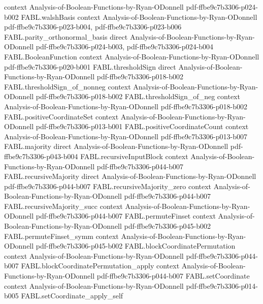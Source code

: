 \begin{theorem}
  {context}
  {Analysis-of-Boolean-Functions-by-Ryan-ODonnell}
  {pdf-ffbe9c7b3306-p024-b002}
\proofstep
  {FABL.walshBasis}
  {context}
  {Analysis-of-Boolean-Functions-by-Ryan-ODonnell}
  {pdf-ffbe9c7b3306-p023-b004,
    pdf-ffbe9c7b3306-p023-b006}
\proofstep
  {FABL.parity_orthonormal_basis}
  {direct}
  {Analysis-of-Boolean-Functions-by-Ryan-ODonnell}
  {pdf-ffbe9c7b3306-p024-b003,
    pdf-ffbe9c7b3306-p024-b004}
\proofstep
  {FABL.BooleanFunction}
  {context}
  {Analysis-of-Boolean-Functions-by-Ryan-ODonnell}
  {pdf-ffbe9c7b3306-p020-b001}
\proofstep
  {FABL.thresholdSign}
  {direct}
  {Analysis-of-Boolean-Functions-by-Ryan-ODonnell}
  {pdf-ffbe9c7b3306-p018-b002}
\proofstep
  {FABL.thresholdSign_of_nonneg}
  {context}
  {Analysis-of-Boolean-Functions-by-Ryan-ODonnell}
  {pdf-ffbe9c7b3306-p018-b002}
\proofstep
  {FABL.thresholdSign_of_neg}
  {context}
  {Analysis-of-Boolean-Functions-by-Ryan-ODonnell}
  {pdf-ffbe9c7b3306-p018-b002}
\proofstep
  {FABL.positiveCoordinateSet}
  {context}
  {Analysis-of-Boolean-Functions-by-Ryan-ODonnell}
  {pdf-ffbe9c7b3306-p013-b001}
\proofstep
  {FABL.positiveCoordinateCount}
  {context}
  {Analysis-of-Boolean-Functions-by-Ryan-ODonnell}
  {pdf-ffbe9c7b3306-p013-b007}
\proofstep
  {FABL.majority}
  {direct}
  {Analysis-of-Boolean-Functions-by-Ryan-ODonnell}
  {pdf-ffbe9c7b3306-p043-b004}
\proofstep
  {FABL.recursiveInputBlock}
  {context}
  {Analysis-of-Boolean-Functions-by-Ryan-ODonnell}
  {pdf-ffbe9c7b3306-p044-b007}
\proofstep
  {FABL.recursiveMajority}
  {direct}
  {Analysis-of-Boolean-Functions-by-Ryan-ODonnell}
  {pdf-ffbe9c7b3306-p044-b007}
\proofstep
  {FABL.recursiveMajority_zero}
  {context}
  {Analysis-of-Boolean-Functions-by-Ryan-ODonnell}
  {pdf-ffbe9c7b3306-p044-b007}
\proofstep
  {FABL.recursiveMajority_succ}
  {context}
  {Analysis-of-Boolean-Functions-by-Ryan-ODonnell}
  {pdf-ffbe9c7b3306-p044-b007}
\proofstep
  {FABL.permuteFinset}
  {context}
  {Analysis-of-Boolean-Functions-by-Ryan-ODonnell}
  {pdf-ffbe9c7b3306-p045-b002}
\proofstep
  {FABL.permuteFinset_symm}
  {context}
  {Analysis-of-Boolean-Functions-by-Ryan-ODonnell}
  {pdf-ffbe9c7b3306-p045-b002}
\proofstep
  {FABL.blockCoordinatePermutation}
  {context}
  {Analysis-of-Boolean-Functions-by-Ryan-ODonnell}
  {pdf-ffbe9c7b3306-p044-b007}
\proofstep
  {FABL.blockCoordinatePermutation_apply}
  {context}
  {Analysis-of-Boolean-Functions-by-Ryan-ODonnell}
  {pdf-ffbe9c7b3306-p044-b007}
\proofstep
  {FABL.setCoordinate}
  {context}
  {Analysis-of-Boolean-Functions-by-Ryan-ODonnell}
  {pdf-ffbe9c7b3306-p014-b005}
\proofstep
  {FABL.setCoordinate_apply_self}

\end{theorem}
